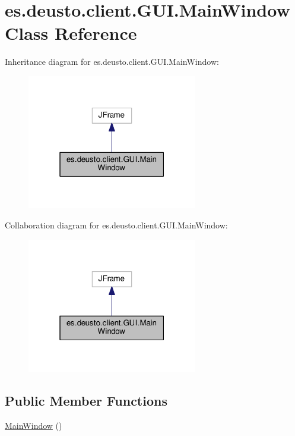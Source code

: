 \hypertarget{classes_1_1deusto_1_1client_1_1_g_u_i_1_1_main_window}{}\section{es.\+deusto.\+client.\+G\+U\+I.\+Main\+Window Class Reference}
\label{classes_1_1deusto_1_1client_1_1_g_u_i_1_1_main_window}


Inheritance diagram for es.\+deusto.\+client.\+G\+U\+I.\+Main\+Window\+:\nopagebreak
\begin{figure}[H]
\begin{center}
\leavevmode
\includegraphics[width=211pt]{classes_1_1deusto_1_1client_1_1_g_u_i_1_1_main_window__inherit__graph}
\end{center}
\end{figure}


Collaboration diagram for es.\+deusto.\+client.\+G\+U\+I.\+Main\+Window\+:\nopagebreak
\begin{figure}[H]
\begin{center}
\leavevmode
\includegraphics[width=211pt]{classes_1_1deusto_1_1client_1_1_g_u_i_1_1_main_window__coll__graph}
\end{center}
\end{figure}
\subsection*{Public Member Functions}
\begin{DoxyCompactItemize}
\item 
\hyperlink{classes_1_1deusto_1_1client_1_1_g_u_i_1_1_main_window_a471b4c0c749b9f22c1c74f85a410c1c9}{Main\+Window} ()
\end{DoxyCompactItemize}


